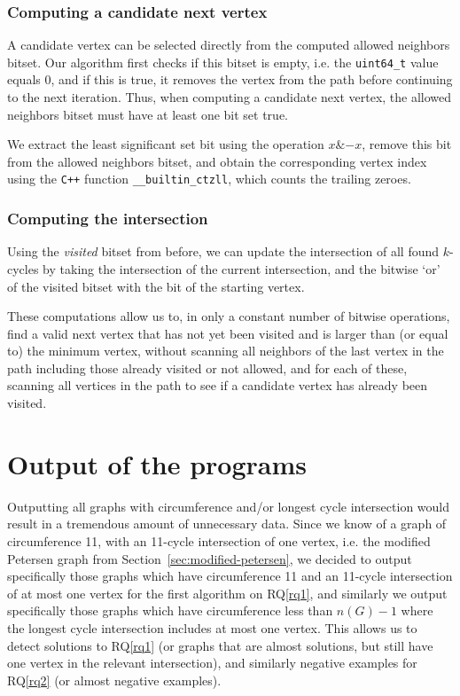 \subsubsection{Computing a candidate next vertex}

A candidate vertex can be selected directly from the computed allowed neighbors bitset. Our algorithm first checks if this bitset is empty, i.e. the \texttt{uint64\_t} value equals 0, and if this is true, it removes the vertex from the path before continuing to the next iteration. Thus, when computing a candidate next vertex, the allowed neighbors bitset must have at least one bit set true.

We extract the least significant set bit using the operation $x \mathbin{\&} -x$, remove this bit from the allowed neighbors bitset, and obtain the corresponding vertex index using the \texttt{C++} function \texttt{\_\_builtin\_ctzll}, which counts the trailing zeroes.

\subsubsection{Computing the intersection}

Using the \textit{visited} bitset from before, we can update the intersection of all found $k$-cycles by taking the intersection of the current intersection, and the bitwise `or' of the visited bitset with the bit of the starting vertex.

These computations allow us to, in only a constant number of bitwise operations, find a valid next vertex that has not yet been visited and is larger than (or equal to) the minimum vertex, without scanning all neighbors of the last vertex in the path including those already visited or not allowed, and for each of these, scanning all vertices in the path to see if a candidate vertex has already been visited.

\section{Output of the programs}

Outputting all graphs with circumference and/or longest cycle intersection would result in a tremendous amount of unnecessary data. Since we know of a graph of circumference 11, with an 11-cycle intersection of one vertex, i.e. the modified Petersen graph from Section~\ref{sec:modified-petersen}, we decided to output specifically those graphs which have circumference 11 and an 11-cycle intersection of at most one vertex for the first algorithm on RQ\ref{rq1}, and similarly we output specifically those graphs which have circumference less than $n(G)-1$ where the longest cycle intersection includes at most one vertex. This allows us to detect solutions to RQ\ref{rq1} (or graphs that are almost solutions, but still have one vertex in the relevant intersection), and similarly negative examples for RQ\ref{rq2} (or almost negative examples).

